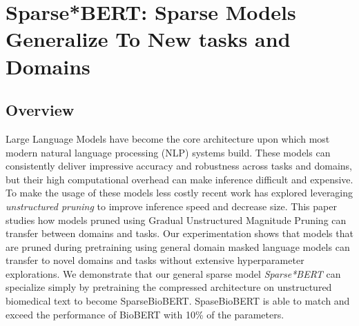 \section{Sparse*BERT: Sparse Models Generalize To New tasks and Domains}
\subsection{Overview}
Large Language Models have become the core architecture upon which most modern natural language processing (NLP) systems build. These models can consistently deliver impressive accuracy and robustness across tasks and domains, but their high computational overhead can make inference difficult and expensive. To make the usage of these models less costly recent work has explored leveraging \textit{unstructured pruning} to improve inference speed and decrease size. This paper studies how models pruned using Gradual Unstructured Magnitude Pruning can transfer between domains and tasks. Our experimentation shows that models that are pruned during pretraining using general domain masked language models can transfer to novel domains and tasks without extensive hyperparameter explorations. We demonstrate that our general sparse model \textit{Sparse*BERT} can specialize simply by pretraining the compressed architecture on unstructured biomedical text to become SparseBioBERT. SpaseBioBERT is able to match and exceed the performance of BioBERT with 10\% of the parameters.
